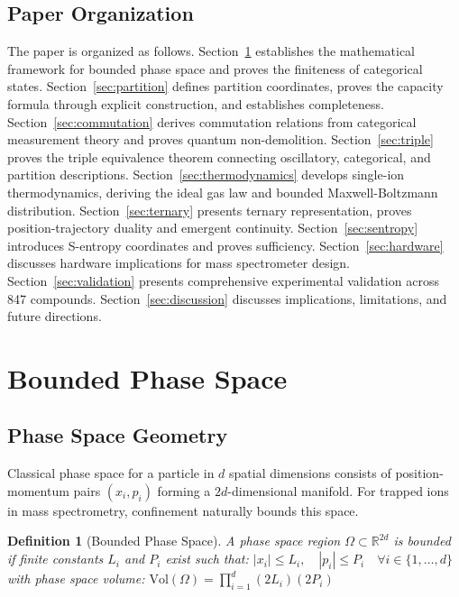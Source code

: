 \documentclass[twocolumn,10pt]{article}
\newtheorem{definition}[theorem]{Definition}
\begin{document}
\subsection{Paper Organization}

The paper is organized as follows. Section~\ref{sec:bounded} establishes the mathematical framework for bounded phase space and proves the finiteness of categorical states. Section~\ref{sec:partition} defines partition coordinates, proves the capacity formula through explicit construction, and establishes completeness. Section~\ref{sec:commutation} derives commutation relations from categorical measurement theory and proves quantum non-demolition. Section~\ref{sec:triple} proves the triple equivalence theorem connecting oscillatory, categorical, and partition descriptions. Section~\ref{sec:thermodynamics} develops single-ion thermodynamics, deriving the ideal gas law and bounded Maxwell-Boltzmann distribution. Section~\ref{sec:ternary} presents ternary representation, proves position-trajectory duality and emergent continuity. Section~\ref{sec:sentropy} introduces S-entropy coordinates and proves sufficiency. Section~\ref{sec:hardware} discusses hardware implications for mass spectrometer design. Section~\ref{sec:validation} presents comprehensive experimental validation across 847 compounds. Section~\ref{sec:discussion} discusses implications, limitations, and future directions.

\section{Bounded Phase Space}
\label{sec:bounded}

\subsection{Phase Space Geometry}

Classical phase space for a particle in $d$ spatial dimensions consists of position-momentum pairs $(x_i, p_i)$ forming a $2d$-dimensional manifold. For trapped ions in mass spectrometry, confinement naturally bounds this space.

\begin{definition}[Bounded Phase Space]
\label{def:bounded}
A phase space region $\Omega \subset \mathbb{R}^{2d}$ is \emph{bounded} if finite constants $L_i$ and $P_i$ exist such that:
$
|x_i| \leq L_i, \quad |p_i| \leq P_i \quad \forall i \in \{1, \ldots, d\}
$
with phase space volume:
$
\mathrm{Vol}(\Omega) = \prod_{i=1}^{d} (2L_i)(2P_i)
$
\end{definition}
\end{document}
